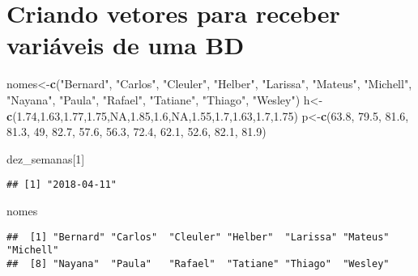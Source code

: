\documentclass[]{article}
\newenvironment{Shaded}{\begin{snugshade}}{\end{snugshade}}
\newcommand{\KeywordTok}[1]{\textcolor[rgb]{0.13,0.29,0.53}{\textbf{#1}}}
\newcommand{\DecValTok}[1]{\textcolor[rgb]{0.00,0.00,0.81}{#1}}
\newcommand{\FloatTok}[1]{\textcolor[rgb]{0.00,0.00,0.81}{#1}}
\newcommand{\StringTok}[1]{\textcolor[rgb]{0.31,0.60,0.02}{#1}}
\newcommand{\OtherTok}[1]{\textcolor[rgb]{0.56,0.35,0.01}{#1}}
\newcommand{\NormalTok}[1]{#1}
\begin{document}
\section{Criando vetores para receber variáveis de uma
BD}\label{criando-vetores-para-receber-variaveis-de-uma-bd}

\begin{Shaded}
\begin{Highlighting}[]
\NormalTok{nomes<-}\KeywordTok{c}\NormalTok{(}\StringTok{"Bernard"}\NormalTok{,}
\StringTok{"Carlos"}\NormalTok{,}
\StringTok{"Cleuler"}\NormalTok{,}
\StringTok{"Helber"}\NormalTok{,}
\StringTok{"Larissa"}\NormalTok{,}
\StringTok{"Mateus"}\NormalTok{,}
\StringTok{"Michell"}\NormalTok{,}
\StringTok{"Nayana"}\NormalTok{,}
\StringTok{"Paula"}\NormalTok{,}
\StringTok{"Rafael"}\NormalTok{,}
\StringTok{"Tatiane"}\NormalTok{,}
\StringTok{"Thiago"}\NormalTok{,}
\StringTok{"Wesley"}\NormalTok{)}
\NormalTok{h<-}\KeywordTok{c}\NormalTok{(}\FloatTok{1.74}\NormalTok{,}\FloatTok{1.63}\NormalTok{,}\FloatTok{1.77}\NormalTok{,}\FloatTok{1.75}\NormalTok{,}\OtherTok{NA}\NormalTok{,}\FloatTok{1.85}\NormalTok{,}\FloatTok{1.6}\NormalTok{,}\OtherTok{NA}\NormalTok{,}\FloatTok{1.55}\NormalTok{,}\FloatTok{1.7}\NormalTok{,}\FloatTok{1.63}\NormalTok{,}\FloatTok{1.7}\NormalTok{,}\FloatTok{1.75}\NormalTok{)}
\NormalTok{p<-}\KeywordTok{c}\NormalTok{(}\FloatTok{63.8}\NormalTok{,}
\FloatTok{79.5}\NormalTok{,}
\FloatTok{81.6}\NormalTok{,}
\FloatTok{81.3}\NormalTok{,}
\DecValTok{49}\NormalTok{,}
\FloatTok{82.7}\NormalTok{,}
\FloatTok{57.6}\NormalTok{,}
\FloatTok{56.3}\NormalTok{,}
\FloatTok{72.4}\NormalTok{,}
\FloatTok{62.1}\NormalTok{,}
\FloatTok{52.6}\NormalTok{,}
\FloatTok{82.1}\NormalTok{,}
\FloatTok{81.9}\NormalTok{)}

\NormalTok{dez_semanas[}\DecValTok{1}\NormalTok{]}
\end{Highlighting}
\end{Shaded}

\begin{verbatim}
## [1] "2018-04-11"
\end{verbatim}

\begin{Shaded}
\begin{Highlighting}[]
\NormalTok{nomes}
\end{Highlighting}
\end{Shaded}

\begin{verbatim}
##  [1] "Bernard" "Carlos"  "Cleuler" "Helber"  "Larissa" "Mateus"  "Michell"
##  [8] "Nayana"  "Paula"   "Rafael"  "Tatiane" "Thiago"  "Wesley"
\end{verbatim}
\end{document}
